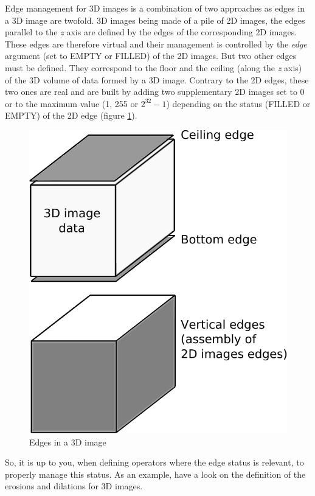 \documentclass[a4paper,10pt,oneside]{article}
\begin{document}
Edge management for 3D images is a combination of two approaches as edges in a 3D image
are twofold. 3D images being made of a pile of 2D images, the edges parallel to the
\emph{z} axis are defined by the edges of the corresponding 2D images. These edges are
therefore virtual and their management is controlled by the \textit{edge} argument
(set to EMPTY or FILLED) of the 2D images. But two other edges must be defined. They correspond
to the floor and the ceiling (along the \emph{z} axis) of the 3D volume of data formed by a
3D image. Contrary to the 2D edges, these two ones are real and are built by adding two
supplementary 2D images set to 0 or to the maximum value (1, 255 or $2^{32} - 1$) depending
on the status (FILLED or EMPTY) of the 2D edge (figure \ref{fig:3D_edges}).

\begin{figure}
\centering
\includegraphics[scale=0.6]{figures/3D_edges.pdf}
\caption{Edges in a 3D image}
\label{fig:3D_edges}
\end{figure}

So, it is up to you, when defining operators where the edge status is relevant, to properly
manage this status. As an example, have a look on the definition of the erosions and dilations for 3D images.
\end{document}
